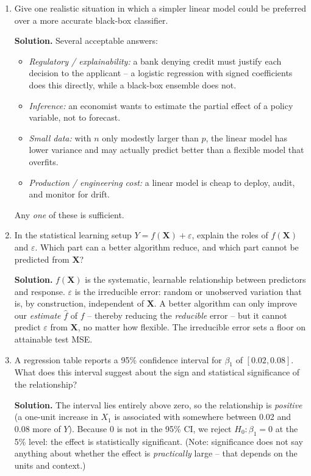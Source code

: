 \documentclass[11pt]{article}
\newcommand{\solution}[1]{%
  \par\medskip\noindent\textbf{Solution.} #1\par\medskip
}
\begin{document}
\begin{enumerate}[leftmargin=*]
\item Give one realistic situation in which a simpler linear model could be preferred over a more accurate black-box classifier.

\solution{Several acceptable answers:
\begin{itemize}
\item \emph{Regulatory / explainability:} a bank denying credit must justify each decision to the applicant -- a logistic regression with signed coefficients does this directly, while a black-box ensemble does not.
\item \emph{Inference:} an economist wants to estimate the partial effect of a policy variable, not to forecast.
\item \emph{Small data:} with $n$ only modestly larger than $p$, the linear model has lower variance and may actually predict better than a flexible model that overfits.
\item \emph{Production / engineering cost:} a linear model is cheap to deploy, audit, and monitor for drift.
\end{itemize}
Any \emph{one} of these is sufficient.}

\item In the statistical learning setup $Y = f(\mathbf{X}) + \varepsilon$, explain the roles of $f(\mathbf{X})$ and $\varepsilon$. Which part can a better algorithm reduce, and which part cannot be predicted from $\mathbf{X}$?

\solution{$f(\mathbf{X})$ is the systematic, learnable relationship between predictors and response. $\varepsilon$ is the irreducible error: random or unobserved variation that is, by construction, independent of $\mathbf{X}$. A better algorithm can only improve our \emph{estimate} $\hat f$ of $f$ -- thereby reducing the \emph{reducible} error -- but it cannot predict $\varepsilon$ from $\mathbf{X}$, no matter how flexible. The irreducible error sets a floor on attainable test MSE.}

\item A regression table reports a 95\% confidence interval for $\beta_1$ of $[0.02, 0.08]$. What does this interval suggest about the sign and statistical significance of the relationship?

\solution{The interval lies entirely above zero, so the relationship is \emph{positive} (a one-unit increase in $X_1$ is associated with somewhere between 0.02 and 0.08 more of $Y$). Because $0$ is not in the 95\% CI, we reject $H_0: \beta_1 = 0$ at the 5\% level: the effect is statistically significant. (Note: significance does not say anything about whether the effect is \emph{practically} large -- that depends on the units and context.)}


\end{enumerate}
\end{document}
